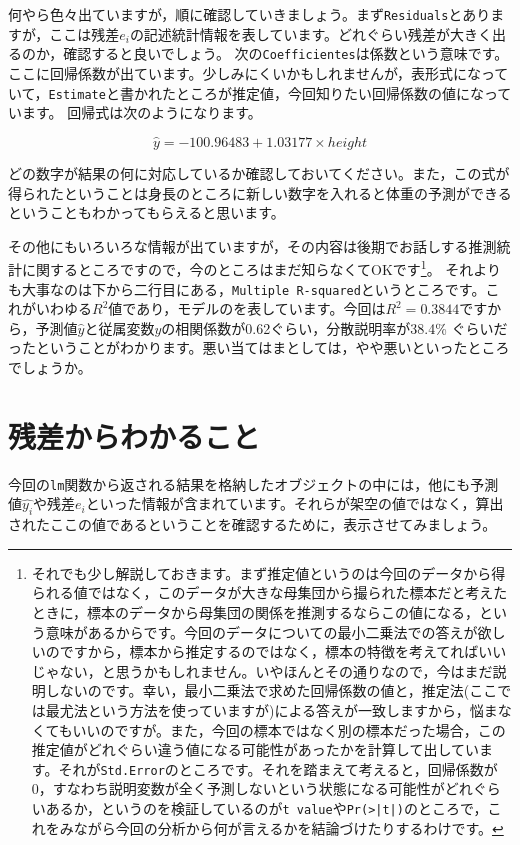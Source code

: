 \documentclass{ltjbook}
\begin{document}
何やら色々出ていますが，順に確認していきましょう。まず\texttt{Residuals}とありますが，ここは残差$e_i$の記述統計情報を表しています。どれぐらい残差が大きく出るのか，確認すると良いでしょう。
次の\texttt{Coefficientes}は係数という意味です。ここに回帰係数が出ています。少しみにくいかもしれませんが，表形式になっていて，\texttt{Estimate}と書かれたところが推定値，今回知りたい回帰係数の値になっています。
回帰式は次のようになります。

\[ \hat{y} = -100.96483 + 1.03177 \times height \]

どの数字が結果の何に対応しているか確認しておいてください。また，この式が得られたということは身長のところに新しい数字を入れると体重の予測ができるということもわかってもらえると思います。

その他にもいろいろな情報が出ていますが，その内容は後期でお話しする推測統計に関するところですので，今のところはまだ知らなくてOKです\footnote{それでも少し解説しておきます。まず推定値というのは今回のデータから得られる値ではなく，このデータが大きな母集団から撮られた標本だと考えたときに，標本のデータから母集団の関係を推測するならこの値になる，という意味があるからです。今回のデータについての最小二乗法での答えが欲しいのですから，標本から推定するのではなく，標本の特徴を考えてればいいじゃない，と思うかもしれません。いやほんとその通りなので，今はまだ説明しないのです。幸い，最小二乗法で求めた回帰係数の値と，推定法(ここでは最尤法という方法を使っていますが)による答えが一致しますから，悩まなくてもいいのですが。また，今回の標本ではなく別の標本だった場合，この推定値がどれぐらい違う値になる可能性があったかを計算して出しています。それが\texttt{Std.Error}のところです。それを踏まえて考えると，回帰係数が0，すなわち説明変数が全く予測しないという状態になる可能性がどれぐらいあるか，というのを検証しているのが\texttt{t value}や\texttt{Pr(>|t|)}のところで，これをみながら今回の分析から何が言えるかを結論づけたりするわけです。}。
それよりも大事なのは下から二行目にある，\texttt{Multiple R-squared}というところです。これがいわゆる$R^2$値であり，モデルのを表しています。今回は$R^2=0.3844$ですから，予測値$\hat{y}$と従属変数$y$の相関係数が0.62ぐらい，分散説明率が38.4\% ぐらいだったということがわかります。悪い当てはまとしては，やや悪いといったところでしょうか。

\section{残差からわかること}
今回の\texttt{lm}関数から返される結果を格納したオブジェクトの中には，他にも予測値$\hat{y_i}$や残差$e_i$といった情報が含まれています。それらが架空の値ではなく，算出されたここの値であるということを確認するために，表示させてみましょう。
\end{document}
